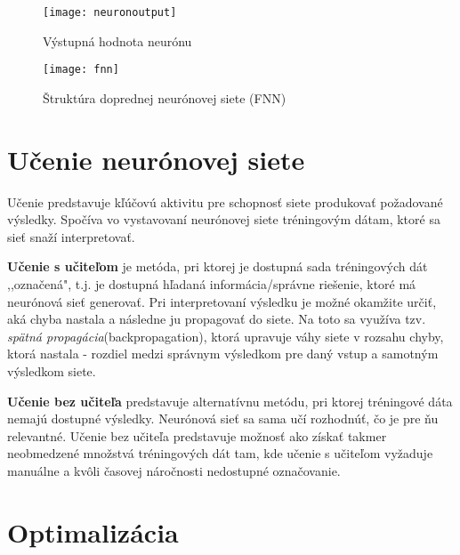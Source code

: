 

\begin{figure}[H]
\begin{center}\texttt{[image: neuronoutput]}\end{center}
\caption[neuronoutput]{Výstupná hodnota neurónu~\cite{kvasnivcka1997uvod}}\label{fig:neuronoutput}
\end{figure}

\noindent



\begin{figure}[H]
\begin{center}\texttt{[image: fnn]}\end{center}
\caption[fnn]{Štruktúra doprednej neurónovej siete (FNN)~\cite{jaeger2002tutorial}}\label{fig:fnn}
\end{figure}

\section{Učenie neurónovej siete}
\label{analyza_ucenie_nn}

Učenie predstavuje kľúčovú aktivitu pre schopnosť siete produkovať požadované výsledky. Spočíva vo vystavovaní neurónovej siete tréningovým dátam, ktoré sa sieť snaží interpretovať.

\textbf{Učenie s učiteľom} je metóda, pri ktorej je dostupná sada tréningových dát ,,označená", t.j. je dostupná hľadaná informácia/správne riešenie, ktoré má neurónová sieť generovať. Pri interpretovaní výsledku je možné okamžite určiť, aká chyba nastala a následne ju propagovať do siete. Na toto sa využíva tzv. \textit{spätná propagácia}(backpropagation), ktorá upravuje váhy siete v rozsahu chyby, ktorá nastala - rozdiel medzi správnym výsledkom pre daný vstup a samotným výsledkom siete.
\noindent

\textbf{Učenie bez učiteľa} predstavuje alternatívnu metódu, pri ktorej tréningové dáta nemajú dostupné výsledky. Neurónová sieť sa sama učí rozhodnúť, čo je pre ňu relevantné. Učenie bez učiteľa predstavuje možnosť ako získať takmer neobmedzené množstvá tréningových dát tam, kde učenie s učiteľom vyžaduje manuálne a kvôli časovej náročnosti nedostupné označovanie.
\noindent

\section{Optimalizácia}
\label{optimalization}

